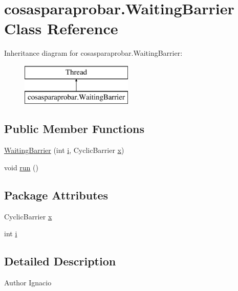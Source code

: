 \hypertarget{classcosasparaprobar_1_1_waiting_barrier}{}\section{cosasparaprobar.\+Waiting\+Barrier Class Reference}
\label{classcosasparaprobar_1_1_waiting_barrier}
Inheritance diagram for cosasparaprobar.\+Waiting\+Barrier\+:\begin{figure}[H]
\begin{center}
\leavevmode
\includegraphics[height=2.000000cm]{classcosasparaprobar_1_1_waiting_barrier}
\end{center}
\end{figure}
\subsection*{Public Member Functions}
\begin{DoxyCompactItemize}
\item 
\mbox{\hyperlink{classcosasparaprobar_1_1_waiting_barrier_a0914ceff2faf3ab517feecd074549789}{Waiting\+Barrier}} (int \mbox{\hyperlink{classcosasparaprobar_1_1_waiting_barrier_a6549abdaae9647b2134980d403273773}{i}}, Cyclic\+Barrier \mbox{\hyperlink{classcosasparaprobar_1_1_waiting_barrier_ac29649ee49c77a7acdd5598806a0c097}{x}})
\item 
void \mbox{\hyperlink{classcosasparaprobar_1_1_waiting_barrier_a8bd7e01bc5d2cf7a34f6c97ca9cea646}{run}} ()
\end{DoxyCompactItemize}
\subsection*{Package Attributes}
\begin{DoxyCompactItemize}
\item 
Cyclic\+Barrier \mbox{\hyperlink{classcosasparaprobar_1_1_waiting_barrier_ac29649ee49c77a7acdd5598806a0c097}{x}}
\item 
int \mbox{\hyperlink{classcosasparaprobar_1_1_waiting_barrier_a6549abdaae9647b2134980d403273773}{i}}
\end{DoxyCompactItemize}


\subsection{Detailed Description}
\begin{DoxyAuthor}{Author}
Ignacio 
\end{DoxyAuthor}


